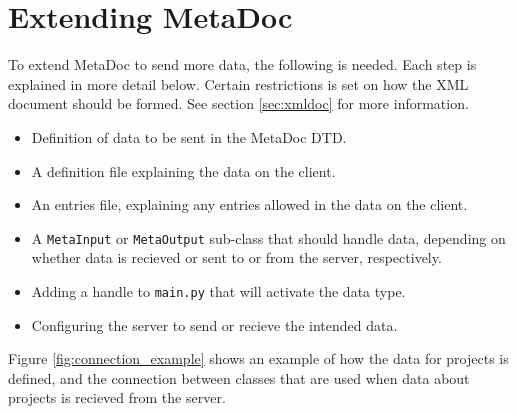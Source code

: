 \newpage
\section{Extending MetaDoc}
\label{sec:extending}
To extend MetaDoc to send more data, the following is needed. Each step is 
explained in more detail below. Certain restrictions is set on how the XML
document should be formed. See section \ref{sec:xmldoc} for more information.

\begin{itemize}
    \item
        Definition of data to be sent in the MetaDoc DTD.
    \item
        A definition file explaining the data on the client.
    \item
        An entries file, explaining any entries allowed in the data on the 
        client.
    \item
        A \texttt{MetaInput} or \texttt{MetaOutput} sub-class that should
        handle data, depending on whether data is recieved or sent to or from
        the server, respectively.
    \item
        Adding a handle to \texttt{main.py} that will activate the data type.
    \item
        Configuring the server to send or recieve the intended data.
\end{itemize}

Figure \ref{fig:connection_example} shows an example of how the data for
projects is defined, and the connection between classes that are used when data
about projects is recieved from the server.

